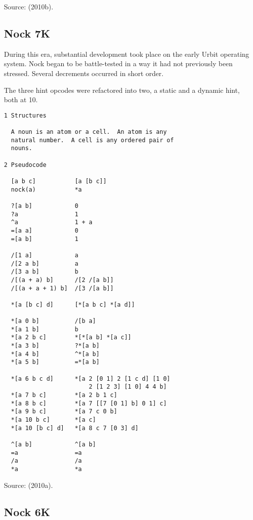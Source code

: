 \documentclass[twoside]{article}
\begin{document}
Source:   (2010b). %

\subsection{Nock 7K}

During this era, substantial development took place on the early Urbit operating system.  Nock began to be battle-tested in a way it had not previously been stressed.  Several decrements occurred in short order.

The three hint opcodes were refactored into two, a static and a dynamic hint, both at 10.

\begin{lstlisting}[label=lst:nock7k,caption={Nock 7K, \textit{terminus ad quem} 14 November 2010.},style=listingcode]
1 Structures

  A noun is an atom or a cell.  An atom is any
  natural number.  A cell is any ordered pair of
  nouns.

2 Pseudocode

  [a b c]           [a [b c]]
  nock(a)           *a

  ?[a b]            0
  ?a                1
  ^a                1 + a
  =[a a]            0
  =[a b]            1

  /[1 a]            a
  /[2 a b]          a
  /[3 a b]          b
  /[(a + a) b]      /[2 /[a b]]
  /[(a + a + 1) b]  /[3 /[a b]]

  *[a [b c] d]      [*[a b c] *[a d]]

  *[a 0 b]          /[b a]
  *[a 1 b]          b
  *[a 2 b c]        *[*[a b] *[a c]]
  *[a 3 b]          ?*[a b]
  *[a 4 b]          ^*[a b]
  *[a 5 b]          =*[a b]

  *[a 6 b c d]      *[a 2 [0 1] 2 [1 c d] [1 0]
                        2 [1 2 3] [1 0] 4 4 b]
  *[a 7 b c]        *[a 2 b 1 c]
  *[a 8 b c]        *[a 7 [[7 [0 1] b] 0 1] c]
  *[a 9 b c]        *[a 7 c 0 b]
  *[a 10 b c]       *[a c]
  *[a 10 [b c] d]   *[a 8 c 7 [0 3] d]

  ^[a b]            ^[a b]
  =a                =a
  /a                /a
  *a                *a
\end{lstlisting}

Source:   (2010a). %

\subsection{Nock 6K}
\end{document}
